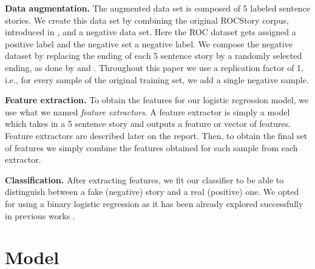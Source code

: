 \documentclass{article}
\begin{document}
\textbf{Data augmentation.} The augmented data set is composed of 5 labeled
sentence stories. We create this data set by combining the original ROCStory
corpus, introduced in \cite{ROCstories}, and a negative data set. Here the ROC
dataset gets assigned a positive label and the negative set a negative label. We
compose the negative dataset by replacing the ending of each 5 sentence story by
a randomly selected ending, as done by \cite{LSTMClassifier} and
\cite{SENTENCE_EMB}. Throughout this paper we use a replication factor of 1,
i.e., for every sample of the original training set, we add a single negative
sample.

\textbf{Feature extraction.} To obtain the features for our logistic regression
model, we use what we named {\it feature extractors}. A feature extractor is
simply a model which takes in a 5 sentence story and outputs a feature or vector
of features. Feature extractors are described later on the report.  Then, to
obtain the final set of features we simply combine the features obtained for
each sample from each extractor.

\textbf{Classification.} After extracting features, we fit our classifier to be
able to distinguish between a fake (negative) story and a real (positive) one.
We opted for using a binary logistic regression as it has been already explored
successfully in previous works \cite{UWNLP,Goel,COGCOMP}.


\section{Model}
\end{document}
